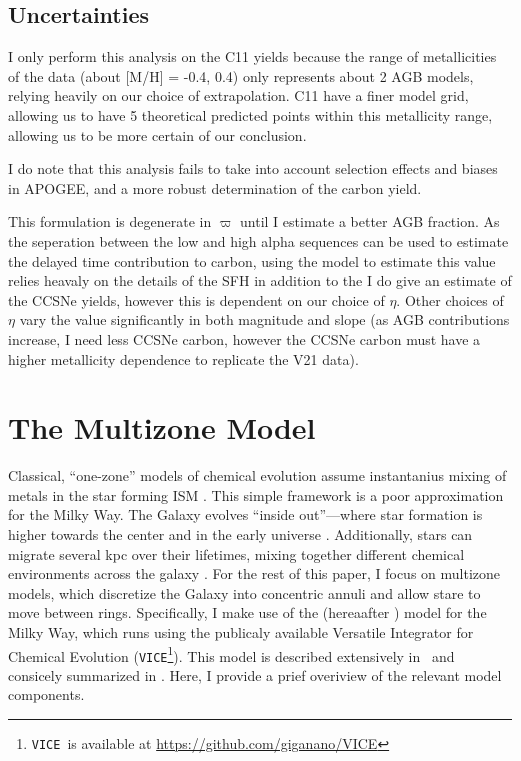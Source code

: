 \documentclass[12pt,oneside]{report}
\newcommand{\JJ}{\citetalias{james+21}}
\newcommand{\VICE}{\texttt{VICE}}
\begin{document}
\section{Uncertainties}

I only perform this analysis on the C11 yields because the range of metallicities of the data (about [M/H] = -0.4, 0.4) only represents about 2 AGB models, relying heavily on our choice of extrapolation. C11 have a finer model grid, allowing us to have 5 theoretical predicted points within this metallicity range, allowing us to be more certain of our conclusion. 

I do note that this analysis fails to take into account selection effects and biases in APOGEE, and a more robust determination of the carbon yield. 


This formulation is degenerate in $\varpi$ until I estimate a better AGB fraction. As the seperation between the low and high alpha sequences can be used to estimate the delayed time contribution to carbon, using the model to estimate this value relies heavaly on the details of the SFH in addition to the 
I do give an estimate of the CCSNe yields, however this is dependent on our choice of $\eta$. Other choices of $\eta$ vary the value significantly in both magnitude and slope (as AGB contributions increase, I need less CCSNe carbon, however the CCSNe carbon must have a higher metallicity dependence to replicate the V21 data). 



\chapter{The Multizone Model}\label{sec:vice}

Classical, ``one-zone'' models of chemical evolution assume instantanius mixing of metals in the star forming ISM \citep[e.g.][]{matteucci21}. This simple framework is a poor approximation for the Milky Way.  The Galaxy evolves ``inside out''---where star formation is higher towards the center and in the early universe \citep{bird+13}. Additionally, stars can migrate several kpc over their lifetimes, mixing together different chemical environments across the galaxy \citep{bird+12,sellwood+binney02}. For the rest of this paper, I focus on multizone models, which discretize the Galaxy into concentric annuli and allow stare to move between rings.  Specifically, I make use of the \citet{james+21} (hereaafter \JJ) model for the Milky Way, which runs using the publicaly available Versatile Integrator for Chemical Evolution (\VICE\footnote{\VICE~is available at \url{https://github.com/giganano/VICE}}). This model is described extensively in \JJ~and consicely summarized  in \citet{james+22}. Here, I provide a prief overiview of the relevant model components.
\end{document}
